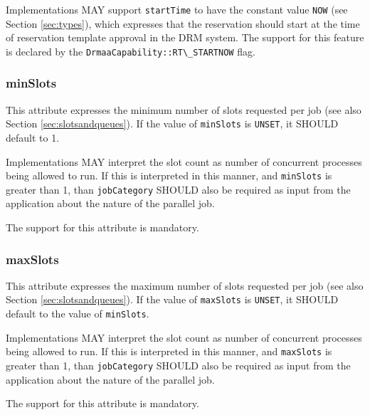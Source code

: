 \documentclass{article}
\newcommand{\h}[1]{\lstinline|#1|}
\newcommand{\rat}[1]{}
\begin{document}
Implementations MAY support \h{startTime} to have the constant value \h{NOW} (see Section \ref{sec:types}), which expresses that the reservation should start at the time of reservation template approval in the DRM system. The support for this feature is declared by the \h{DrmaaCapability::RT\_STARTNOW} flag.

\subsubsection{minSlots}

This attribute expresses the minimum number of slots requested per job (see also Section \ref{sec:slotsandqueues}). If the value of \h{minSlots} is \h{UNSET}, it SHOULD default to 1.

Implementations MAY interpret the slot count as number of concurrent processes being allowed to run. If this is interpreted in this manner, and \h{minSlots} is greater than 1, than \h{jobCategory} SHOULD also be required as input from the application about the nature of the parallel job.

The support for this attribute is mandatory.

\rat{The hint regarding number of concurrent processes intentionally does not speak about processes per host - this would create semantics for our opaque slot concept.}

\subsubsection{maxSlots}

This attribute expresses the maximum number of slots requested per job (see also Section \ref{sec:slotsandqueues}). If the value of \h{maxSlots} is \h{UNSET}, it SHOULD default to the value of \h{minSlots}.

Implementations MAY interpret the slot count as number of concurrent processes being allowed to run. If this is interpreted in this manner, and \h{maxSlots} is greater than 1, than \h{jobCategory} SHOULD also be required as input from the application about the nature of the parallel job.

The support for this attribute is mandatory.

\rat{Conf call June 29th 2011: For maxSlots > 1, the demand for a job category is intentionally only MAY. This is reasoned by the fact that in most DRM systems,  advance reservation is a concept that is independent to the jobs that are later used in this reservation. So you are just requesting just some container, and you do not have to specify at this moment what kind of jobs do you want to run using this reservation (e.g. OpenMP, OpenMPI, MPICH). However, some systems need that information, so we leave it to the implementation how to deal with that.
}
\end{document}
